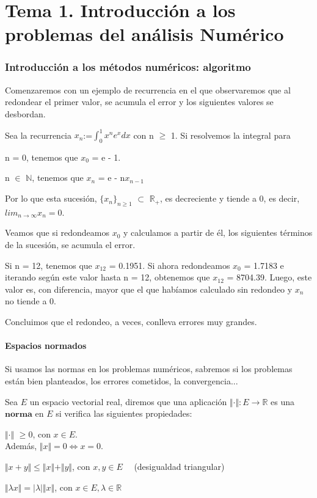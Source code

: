 \part{Tema 1. Introducción a los problemas del análisis Numérico}

\section{Introducción a los métodos numéricos: algoritmo}
Comenzaremos con un ejemplo de recurrencia en el que observaremos que al redondear el primer valor, se acumula el error y los siguientes valores se desbordan.

Sea la recurrencia $x_{n}$:=$\int_{0}^{1} x^{n}e^{x}dx$ con n $\geq$ 1. Si resolvemos la integral para
	\begin{nlist}
	\item n = 0, tenemos que $x_{0}$ = e - 1.
	\item n $\in$ $\mathbb{N}$, tenemos que $x_{n}$ = e - n$x_{n-1}$
	\end{nlist}
Por lo que esta sucesión, $\lbrace x_{n} \rbrace_{n\geq1}$ $\subset$ $\mathbb{R_{+}}$, es decreciente y tiende a 0, es decir, $lim_{n \to \infty} x_{n} = 0$.

Veamos que si redondeamos $x_{0}$ y calculamos a partir de él, los siguientes términos de la sucesión, se acumula el error.

Si n = 12, tenemos que $x_{12}$ = 0.1951. Si ahora redondeamos $x_{0}$ = 1.7183 e iterando según este valor hasta n = 12, obtenemos que $x_{12}$ = 8704.39. Luego, este valor es, con diferencia, mayor que el que habíamos calculado sin redondeo y $x_{n}$ no tiende a 0.

Concluimos que el redondeo, a veces, conlleva errores muy grandes.

\subsection{Espacios normados}
Si usamos las normas en los problemas numéricos, sabremos si los problemas están bien planteados, los errores cometidos, la convergencia...

\begin{ndef}[Norma] 
Sea $E$ un espacio vectorial real, diremos que una aplicación $\Vert \cdot \Vert: E \rightarrow \mathbb{R}$ es una $\textbf{norma}$ en $E$ si verifica las siguientes propiedades:
	\begin{nlist}
	\item $\Vert \cdot \Vert$ $\geq 0$, con $x \in E$.\\
	Además, $\Vert x \Vert = 0 \Leftrightarrow x = 0$.
	\item $\Vert x + y \Vert \leq \Vert x \Vert + \Vert y \Vert$, con $x,y \in E \quad$ (desigualdad triangular)
	\item $\Vert \lambda x \Vert = \vert \lambda \vert \Vert x \Vert$, con $x \in E, \lambda \in \mathbb{R}$
	\end{nlist}
\end{ndef}

